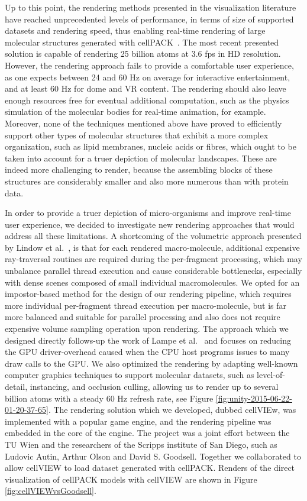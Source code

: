 Up to this point, the rendering methods presented in the visualization literature have reached unprecedented levels of performance, in terms of size of supported datasets and rendering speed, thus enabling real-time rendering of large molecular structures generated with cellPACK~\cite{johnson2015cellpack}.
The most recent presented solution is capable of rendering 25 billion atoms at 3.6 fps in HD resolution.
However, the rendering approach fails to provide a comfortable user experience, as one expects between 24 and 60 Hz on average for interactive entertainment, and at least 60 Hz for dome and VR content.
The rendering should also leave enough resources free for eventual additional computation, such as the physics simulation of the molecular bodies for real-time animation, for example.
Moreover, none of the techniques mentioned above have proved to efficiently support other types of molecular structures that exhibit a more complex organization, such as lipid membranes, nucleic acids or fibres, which ought to be taken into account for a truer depiction of molecular landscapes.
These are indeed more challenging to render, because the assembling blocks of these structures are considerably smaller and also more numerous than with protein data.



In order to provide a truer depiction of micro-organisms and improve real-time user experience, we decided to investigate new rendering approaches that would address all these limitations.
A shortcoming of the volumetric approach presented by Lindow et al.~\cite{lindow2012interactive}, is that for each rendered macro-molecule, additional expensive ray-traversal routines are required during the per-fragment processing, which may unbalance parallel thread execution and cause considerable bottlenecks, especially with dense scenes composed of small individual macromolecules.
We opted for an impostor-based method for the design of our rendering pipeline, which requires more individual per-fragment thread execution per macro-molecule, but is far more balanced and suitable for parallel processing and also does not require expensive volume sampling operation upon rendering. 
The approach which we designed directly follows-up the work of Lampe et al.~\cite{lampe2007two} and focuses on reducing the GPU driver-overhead caused when the CPU host programs issues to many draw calls to the GPU.
We also optimized the rendering by adapting well-known computer graphics techniques to support molecular datasets, such as level-of-detail, instancing, and occlusion culling, allowing us to render up to several billion atoms with a steady 60 Hz refresh rate, see Figure \ref{fig:unity-2015-06-22-01-20-37-65}.
The rendering solution which we developed, dubbed cellVIEw, was implemented with a popular game engine, and the rendering pipeline was embedded in the core of the engine.
The project was a joint effort between the TU Wien and the researchers of the Scripps institute of San Diego, such as Ludovic Autin, Arthur Olson and David S. Goodsell.
Together we collaborated to allow cellVIEW to load dataset generated with cellPACK. Renders of the direct visualization of cellPACK models with cellVIEW are shown in Figure \ref{fig:cellVIEWvsGoodsell}.


